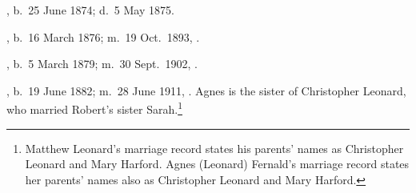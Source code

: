 \begin{Kids}
	
	, b.\ 25 June 1874;\cite{Anna4FernaldBirth} d.\ 5 May 1875.\cite{Anna4FernaldDeath}
	
	, b.\ 16 March 1876; m.\ 19 Oct.\ 1893, .
		
	, b.\ 5 March 1879; m.\ 30 Sept.\ 1902, .
	
	, b.\ 19 June 1882; m.\ 28 June 1911, . Agnes is the sister of Christopher Leonard, who married Robert's sister Sarah.\footnote{Matthew Leonard's marriage record states his parents' names as Christopher Leonard and Mary Harford. Agnes (Leonard) Fernald's marriage record states her parents' names also as Christopher Leonard and Mary Harford.}
	
\end{Kids}
	
	

